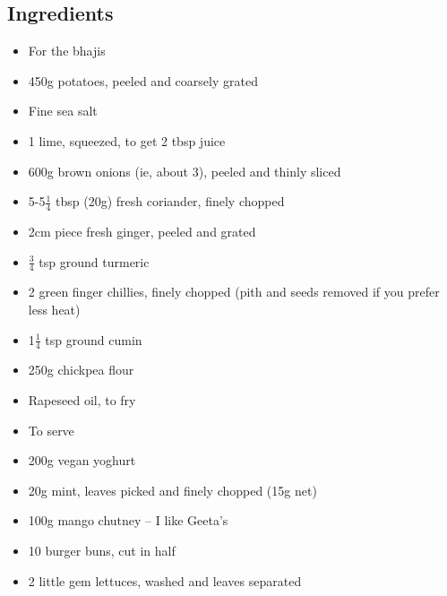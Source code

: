 \documentclass{book}
\begin{document}
\subsection*{Ingredients}
\begin{itemize}
\item For the bhajis
\item 450g potatoes, peeled and coarsely grated
\item Fine sea salt
\item 1 lime, squeezed, to get 2 tbsp juice
\item 600g brown onions (ie, about 3), peeled and thinly sliced
\item 5-5$\frac{1}{4}$ tbsp (20g) fresh coriander, finely chopped
\item 2cm piece fresh ginger, peeled and grated
\item $\frac{3}{4}$ tsp ground turmeric
\item 2 green finger chillies, finely chopped (pith and seeds removed if you prefer less heat)
\item 1$\frac{1}{4}$ tsp ground cumin
\item 250g chickpea flour
\item Rapeseed oil, to fry
\end{itemize}

\begin{itemize}
\item To serve
\item 200g vegan yoghurt
\item 20g mint, leaves picked and finely chopped (15g net)
\item 100g mango chutney – I like Geeta’s
\item 10 burger buns, cut in half
\item 2 little gem lettuces, washed and leaves separated
\end{itemize}
\end{document}
